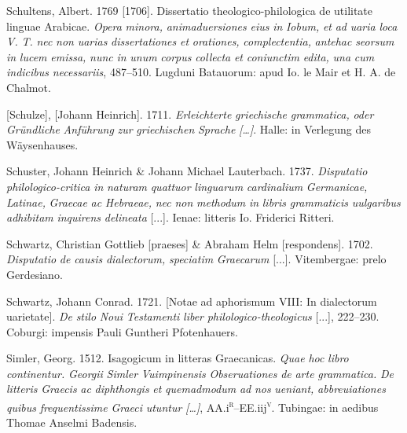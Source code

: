 Schultens, Albert. 1769 [1706]. Dissertatio theologico-philologica de utilitate linguae Arabicae. \textit{Opera} \textit{minora,} \textit{animaduersiones} \textit{eius} \textit{in} \textit{Iobum,} \textit{et} \textit{ad} \textit{uaria} \textit{loca} \textit{V.} \textit{T.} \textit{nec} \textit{non} \textit{uarias} \textit{dissertationes} \textit{et} \textit{orationes,} \textit{complectentia,} \textit{antehac} \textit{seorsum} \textit{in} \textit{lucem} \textit{emissa,} \textit{nunc} \textit{in} \textit{unum} \textit{corpus} \textit{collecta} \textit{et} \textit{coniunctim} \textit{edita,} \textit{una} \textit{cum} \textit{indicibus} \textit{necessariis}, 487–510. Lugduni Batauorum: apud Io. le Mair et H. A. de Chalmot.

[Schulze], [Johann Heinrich]. 1711. \textit{Erleichterte} \textit{griechische} \textit{grammatica,} \textit{oder} \textit{Gründliche} \textit{Anführung} \textit{zur} \textit{griechischen} \textit{Sprache} \textit{[…]}. Halle: in Verlegung des Wäysenhauses.

Schuster, Johann Heinrich \& Johann Michael Lauterbach. 1737. \textit{Disputatio} \textit{philologico-critica} \textit{in} \textit{naturam} \textit{quattuor} \textit{linguarum} \textit{cardinalium} \textit{Germanicae,} \textit{Latinae,} \textit{Graecae} \textit{ac} \textit{Hebraeae,} \textit{nec} \textit{non} \textit{methodum} \textit{in} \textit{libris} \textit{grammaticis} \textit{uulgaribus} \textit{adhibitam} \textit{inquirens} \textit{delineata} [...]. Ienae: litteris Io. Friderici Ritteri.

Schwartz, Christian Gottlieb [praeses] \& Abraham Helm [respondens]. 1702. \textit{Disputatio} \textit{de} \textit{causis} \textit{dialectorum,} \textit{speciatim} \textit{Graecarum} [...]. Vitembergae: prelo Gerdesiano.

Schwartz, Johann Conrad. 1721. [Notae ad aphorismum VIII:  In dialectorum uarietate]. \textit{De} \textit{stilo} \textit{Noui} \textit{Testamenti} \textit{liber} \textit{philologico-theologicus} [...], 222–230. Coburgi: impensis Pauli Guntheri Pfotenhauers.

Simler, Georg. 1512. Isagogicum in litteras Graecanicas. \textit{Quae} \textit{hoc} \textit{libro} \textit{continentur.} \textit{Georgii} \textit{Simler} \textit{Vuimpinensis} \textit{Obseruationes} \textit{de} \textit{arte} \textit{grammatica.} \textit{De} \textit{litteris} \textit{Graecis} \textit{ac} \textit{diphthongis} \textit{et} \textit{quemadmodum} \textit{ad} \textit{nos} \textit{ueniant,} \textit{abbreuiationes} \textit{quibus} \textit{frequentissime} \textit{Graeci} \textit{utuntur} \textit{[…]}, AA.i\textsc{\textsuperscript{r}}–EE.iij\textsc{\textsuperscript{v}}. Tubingae: in aedibus Thomae Anselmi Badensis.

